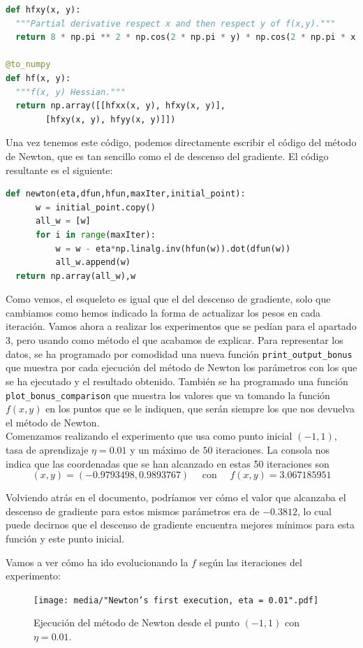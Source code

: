 \documentclass[12pt]{scrartcl}
\begin{document}
{\begin{lstlisting}[language=Python]
def hfxy(x, y):
  """Partial derivative respect x and then respect y of f(x,y)."""
  return 8 * np.pi ** 2 * np.cos(2 * np.pi * y) * np.cos(2 * np.pi * x)

@to_numpy
def hf(x, y):
  """f(x, y) Hessian."""
  return np.array([[hfxx(x, y), hfxy(x, y)],
        [hfxy(x, y), hfyy(x, y)]])
\end{lstlisting}
Una vez tenemos este código, podemos directamente escribir el código del método de Newton, que es tan sencillo como el de descenso del gradiente. El código resultante es el siguiente:


\begin{lstlisting}[language=Python]
  def newton(eta,dfun,hfun,maxIter,initial_point):
	  w = initial_point.copy()
	  all_w = [w]
	  for i in range(maxIter):
		  w = w - eta*np.linalg.inv(hfun(w)).dot(dfun(w))
		  all_w.append(w)
  return np.array(all_w),w
\end{lstlisting}
Como vemos, el esqueleto es igual que el del descenso de gradiente, solo que cambiamos como hemos indicado la forma de actualizar los pesos en cada iteración. Vamos ahora a realizar los experimentos que se pedían 
para el apartado 3, pero usando como método el que acabamos de explicar. Para representar los datos, se ha programado por comodidad una nueva función \lstinline{print_output_bonus} que muestra por cada ejecución del método
de Newton los parámetros con los que se ha ejecutado y el resultado obtenido. También se ha programado una función \lstinline{plot_bonus_comparison} que muestra los valores que va tomando la función $f(x,y)$ en los puntos que se le indiquen,
que serán siempre los que nos devuelva el método de Newton.\\

Comenzamos realizando el experimento que usa como punto inicial $(-1,1)$, tasa de aprendizaje $\eta = 0.01$ y un máximo de $50$ iteraciones. La consola nos indica que las coordenadas que se han alcanzado en estas 50 iteraciones son 
$$
(x,y) = ( -0.9793498 ,  0.9893767 ) \quad \text { con } \quad f(x,y) = 3.067185951
$$

Volviendo atrás en el documento, podríamos ver cómo el valor que alcanzaba el descenso de gradiente para estos mismos parámetros era de $-0.3812$, lo cual puede decirnos que el descenso de gradiente encuentra mejores mínimos para esta función y este punto inicial.

Vamos a ver cómo ha ido evolucionando la $f$ según las iteraciones del experimento:
\begin{figure}[H]
  \centering
  \texttt{[image: media/"Newton's first execution, eta = 0.01".pdf]}
  \caption{Ejecución del método de Newton desde el punto $(-1,1)$ con $\eta = 0.01$.}
\end{figure}

}
\end{document}
